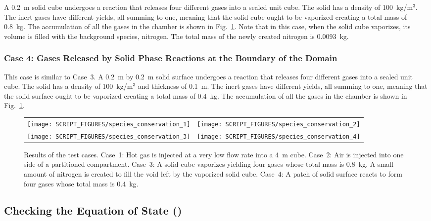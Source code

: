 \documentclass[11pt]{book}
\begin{document}
 A 0.2~m solid cube undergoes a reaction that releases four different gases into a sealed unit cube. The solid has a density of 100~kg/m$^3$. The inert gases have different yields, all summing to one, meaning that the solid cube ought to be vaporized creating a total mass of 0.8~kg. The accumulation of all the gases in the chamber is shown in Fig.~\ref{species_conservation}. Note that in this case, when the solid cube vaporizes, its volume is filled with the background species, nitrogen. The total mass of the newly created nitrogen is 0.0093~kg.

\subsubsection{Case 4: Gases Released by Solid Phase Reactions at the Boundary of the Domain}

 This case is similar to Case~3. A 0.2~m by 0.2~m solid surface undergoes a reaction that releases four different gases into a sealed unit cube. The solid has a density of 100~kg/m$^3$ and thickness of 0.1~m. The inert gases have different yields, all summing to one, meaning that the solid surface ought to be vaporized creating a total mass of 0.4~kg. The accumulation of all the gases in the chamber is shown in Fig.~\ref{species_conservation}.

\begin{figure}[ht]
\begin{tabular*}{\textwidth}{lr}
\texttt{[image: SCRIPT\_FIGURES/species\_conservation\_1]} &
\texttt{[image: SCRIPT\_FIGURES/species\_conservation\_2]} \\
\texttt{[image: SCRIPT\_FIGURES/species\_conservation\_3]} &
\texttt{[image: SCRIPT\_FIGURES/species\_conservation\_4]}
\end{tabular*}
\caption[The  test cases]{Results of the  test cases. Case~1: Hot gas is injected at a very low flow rate into a 4~m cube. Case~2: Air is injected into one side of a partitioned compartment. Case~3: A solid cube vaporizes yielding four gases whose total mass is 0.8~kg. A small amount of nitrogen is created to fill the void left by the vaporized solid cube. Case~4: A patch of solid surface reacts to form four gases whose total mass is 0.4~kg.}
\label{species_conservation}
\end{figure}

\subsection{Checking the Equation of State (\texorpdfstring{}{particle\_offgas})}
\label{particle_offgas_1}
\label{particle_offgas_2}
\label{particle_offgas_3}
\label{particle_offgas_4}
\end{document}
